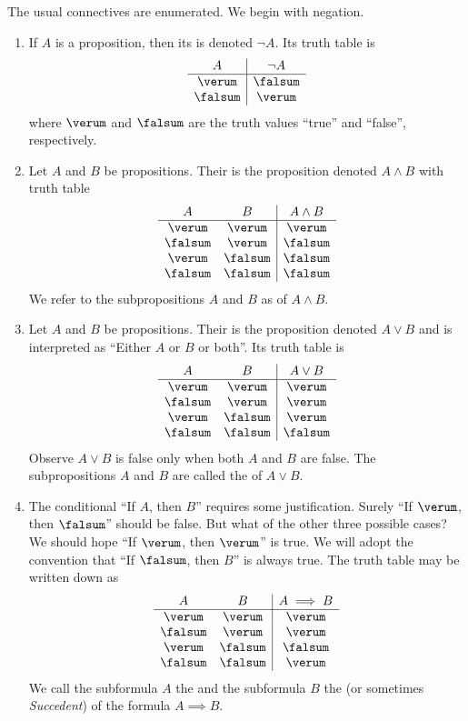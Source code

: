 \begin{node}[Connectives]\label{prop-0001}%
  The usual connectives are enumerated. We begin with negation.
\begin{enumerate}
\item If $A$ is
a proposition, then its  is denoted $\neg A$. Its truth table is
\[\begin{array}{c|c}
A & \neg A\\ \hline
\verum & \falsum\\
\falsum & \verum\\
\end{array}\]
where $\verum$ and $\falsum$ are the truth values ``true'' and
``false'', respectively.
\item Let $A$ and $B$ be propositions. Their  is the
  proposition denoted $A\land B$ with truth table
\[\begin{array}{cc|c}
A & B & A\land B\\\hline
\verum  & \verum  & \verum\\
\falsum & \verum  & \falsum\\
\verum  & \falsum & \falsum\\
\falsum & \falsum & \falsum\\
\end{array}\]
We refer to the subpropositions $A$ and $B$ as  of
$A\land B$.
\item Let $A$ and $B$ be propositions. Their  is the
  proposition denoted $A\lor B$ and is interpreted as ``Either $A$ or
  $B$ or both''. Its truth table is
\[\begin{array}{cc|c}
A & B & A\lor B\\\hline
\verum  & \verum  & \verum\\
\falsum & \verum  & \verum\\
\verum  & \falsum & \verum\\
\falsum & \falsum & \falsum\\
\end{array}\]
Observe $A\lor B$ is false only when both $A$ and $B$ are false.
The subpropositions $A$ and $B$ are called the  of
$A\lor B$.
\item The conditional ``If $A$, then $B$'' requires some
  justification. Surely ``If $\verum$, then $\falsum$'' should be
  false. But what of the other three possible cases? We should hope ``If
  $\verum$, then $\verum$'' is true. We will adopt the convention that
  ``If $\falsum$, then $B$'' is always true. The truth table may be
  written down as
\[\begin{array}{cc|c}
A & B & A\implies B\\\hline
\verum  & \verum  & \verum\\
\falsum & \verum  & \verum\\
\verum  & \falsum & \falsum\\
\falsum & \falsum & \verum\\
\end{array}\]
We call the subformula $A$ the  and the subformula
$B$ the  (or sometimes \textit{Succedent}) of the
formula $A\implies B$.


\end{enumerate}
\end{node}
